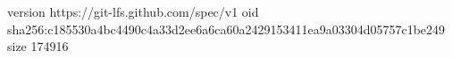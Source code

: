 version https://git-lfs.github.com/spec/v1
oid sha256:c185530a4bc4490c4a33d2ee6a6ca60a2429153411ea9a03304d05757c1be249
size 174916
